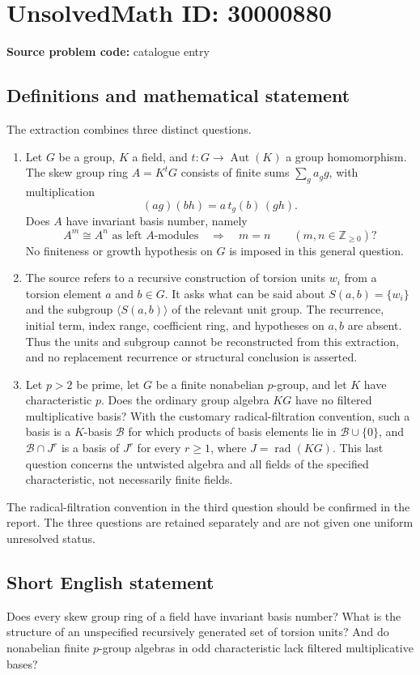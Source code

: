\documentclass[11pt]{article}
\newcommand{\Z}{\mathbb{Z}}
\begin{document}
\section*{UnsolvedMath ID: 30000880}
\textbf{Source problem code:} catalogue entry
\subsection{Definitions and mathematical statement}
The extraction combines three distinct questions.
\begin{enumerate}
\item Let \(G\) be a group, \(K\) a field, and \(t:G\to\operatorname{Aut}(K)\) a group homomorphism. The skew group ring \(A=K^tG\) consists of finite sums \(\sum_g a_g g\), with multiplication
\[
(a g)(b h)=a\,t_g(b)\,(gh).
\]
Does \(A\) have invariant basis number, namely
\[
A^m\cong A^n\text{ as left }A\text{-modules}
\quad\Longrightarrow\quad m=n
\qquad(m,n\in\Z_{\geq0})?
\]
No finiteness or growth hypothesis on \(G\) is imposed in this general question.
\item The source refers to a recursive construction of torsion units \(w_i\) from a torsion element \(a\) and \(b\in G\). It asks what can be said about \(S(a,b)=\{w_i\}\) and the subgroup \(\langle S(a,b)\rangle\) of the relevant unit group. The recurrence, initial term, index range, coefficient ring, and hypotheses on \(a,b\) are absent. Thus the units and subgroup cannot be reconstructed from this extraction, and no replacement recurrence or structural conclusion is asserted.
\item Let \(p>2\) be prime, let \(G\) be a finite nonabelian \(p\)-group, and let \(K\) have characteristic \(p\). Does the ordinary group algebra \(KG\) have no filtered multiplicative basis? With the customary radical-filtration convention, such a basis is a \(K\)-basis \(\mathcal B\) for which products of basis elements lie in \(\mathcal B\cup\{0\}\), and \(\mathcal B\cap J^r\) is a basis of \(J^r\) for every \(r\geq1\), where \(J=\operatorname{rad}(KG)\). This last question concerns the untwisted algebra and all fields of the specified characteristic, not necessarily finite fields.
\end{enumerate}
The radical-filtration convention in the third question should be confirmed in the report. The three questions are retained separately and are not given one uniform unresolved status.
\subsection{Short English statement}
Does every skew group ring of a field have invariant basis number? What is the structure of an unspecified recursively generated set of torsion units? And do nonabelian finite \(p\)-group algebras in odd characteristic lack filtered multiplicative bases?
\end{document}
